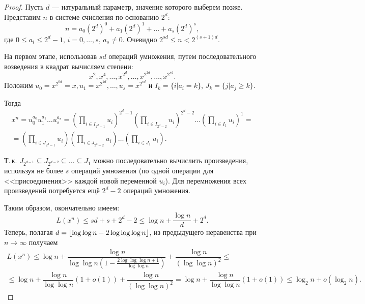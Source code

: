 \begin{proof}
    Пусть $d$ --- натуральный параметр, значение которого выберем позже. Представим $n$ в системе счисления по основанию $2^d$:
    \[
        n = a_0(2^d)^0 + a_1 (2^d)^1 + \ldots + a_s (2^d)^s,
    \]
    где $0 \leqslant a_i \leqslant 2^d-1,\, i=0,\ldots, s,\, a_s \neq 0$. Очевидно $2^{sd} \leqslant n < 2^{(s+1)d}$.

    На первом этапе, использовав $sd$ операций умножения, путем последовательного возведения в квадрат вычисляем степени:
    \[
        x^2, x^4, \ldots, x^{2^d}, \ldots, x^{2^{2d}}, \ldots, x^{2^{sd}}.
    \]
    Положим $u_0 = x^{2^{0d}} = x, u_1 = x^{2^{1d}}, \ldots, u_s = x^{2^{sd}}$ и $I_k=\{i\vert a_i = k\}$, $J_k=\{j \vert a_j \geqslant k\}$.

    Тогда 
    \begin{multline*}
        x^n = u_0^{a_0} u_1^{a_1} \ldots u_s^{a_s} = \left(\prod\limits_{i\in I_{2^d-1}} u_i \right)^{2^d-1} \left(\prod\limits_{i\in I_{2^d-2}} u_i \right)^{2^d-2} \ldots \left(\prod\limits_{i\in I_1} u_i \right)^{1} = \\
        = \left(\prod\limits_{i\in J_{2^d-1}} u_i \right) \left(\prod\limits_{i\in J_{2^d-2}} u_i \right) \ldots \left(\prod\limits_{i\in J_1} u_i \right).
    \end{multline*}
    
    Т.\,к. $J_{2^{d-1}} \subseteq J_{2^{d-2}} \subseteq \ldots \subseteq J_1$ можно последовательно вычислить произведения, используя не более $s$ операций умножения (по одной операции для <<присоединения>> каждой новой переменной $u_i$). Для перемножения всех произведений потребуется ещё $2^d-2$ операций умножения.

    Таким образом, окончательно имеем:
    \[
        L(x^n) \leqslant sd + s + 2^d - 2 \leqslant \log n + \frac{\log n}{d} + 2^d.
    \]
    Теперь, полагая $d = \left\lfloor \log\log n - 2\log\log\log n \right\rfloor$, из предыдущего неравенства при $n \to \infty$ получаем
    \begin{multline*}
        L(x^n) \leqslant \log n + \dfrac{\log n}{\log \log n \left(1 - \frac{2\log \log\log n + 1}{\log \log n}\right)} + \dfrac{\log n}{(\log \log n)^2} \leqslant \\ 
        \leqslant \log n + \dfrac{\log n}{\log \log n} (1 + o(1)) + \dfrac{\log n}{(\log \log n)^2} = \log n + \dfrac{\log n}{\log \log n} (1 + o(1)) \leqslant \log_2 n + o(\log_2 n).
    \end{multline*}
\end{proof}

